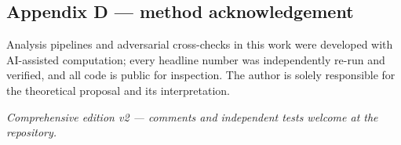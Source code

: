 \documentclass[
]{article}
\begin{document}
\subsection{Appendix D --- method
acknowledgement}\label{appendix-d-method-acknowledgement}

Analysis pipelines and adversarial cross-checks in this work were
developed with AI-assisted computation; every headline number was
independently re-run and verified, and all code is public for
inspection. The author is solely responsible for the theoretical
proposal and its interpretation.

\emph{Comprehensive edition v2 --- comments and independent tests
welcome at the repository.}
\end{document}

